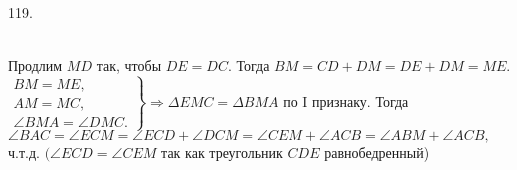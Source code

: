 119. \begin{figure}[ht!]
\end{figure}\\
Продлим $MD$ так, чтобы $DE=DC.$ Тогда $BM=CD+DM=DE+DM=ME.$\\ $\left.\begin{array}{l}BM=ME,\\
AM=MC,\\
\angle BMA=\angle DMC. \end{array}\right\}\Rightarrow \Delta EMC=\Delta BMA\text{ по I признаку.}$ Тогда
$\angle BAC=\angle ECM=\angle ECD+\angle DCM=\angle CEM+\angle ACB=\angle ABM+\angle ACB,$ ч.т.д. $(\angle ECD=\angle CEM$ так как треугольник $CDE$ равнобедренный)\\
